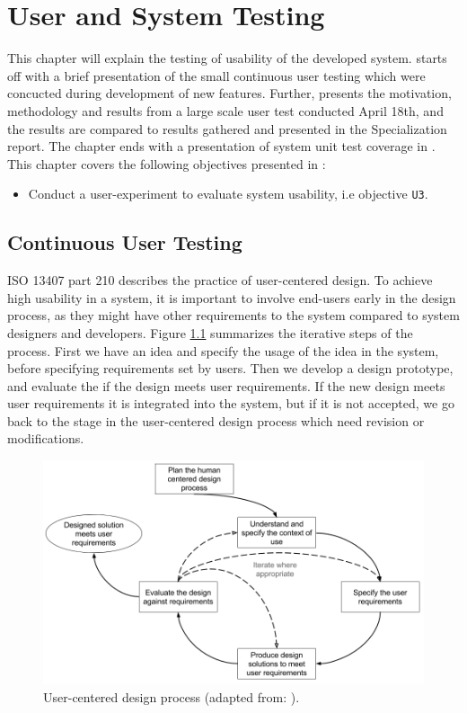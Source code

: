 \chapter{User and System Testing}
\label{ch:testing}
This chapter will explain the testing of usability of the developed system.  starts off with a brief presentation of the small continuous user testing which were concucted during development of new features. Further,  presents the motivation, methodology and results from a large scale user test conducted April 18th, and the results are compared to results gathered and presented in the Specialization report. The chapter ends with a presentation of system unit test coverage in . This chapter covers the following objectives presented in :
\begin{itemize}
  \item Conduct a user-experiment to evaluate system usability, i.e objective \texttt{U3}.
\end{itemize}

\section{Continuous User Testing}
\label{sec:cont-user-testing}
ISO 13407 part 210 \cite{iso1999HCD} describes the practice of user-centered design. To achieve high usability in a system, it is important to involve end-users early in the design process, as they might have other requirements to the system compared to system designers and developers. Figure \ref{fig:user-centered-design} summarizes the iterative steps of the process. First we have an idea and specify the usage of the idea in the system, before specifying requirements set by users. Then we develop a design prototype, and evaluate the if the design meets user requirements. If the new design meets user requirements it is integrated into the system, but if it is not accepted, we go back to the stage in the user-centered design process which need revision or modifications. \\

\begin{figure}
  \centering
  \includegraphics[width=1.0\textwidth]{figs/iterative-design-process.png}
  \caption[User-centered design process]{User-centered design process (adapted from: \cite{iso1999HCD}).}
  \label{fig:user-centered-design}
\end{figure}

